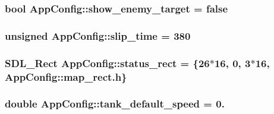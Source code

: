 \subsubsection[{show\+\_\+enemy\+\_\+target}]{\setlength{\rightskip}{0pt plus 5cm}bool App\+Config\+::show\+\_\+enemy\+\_\+target = false\hspace{0.3cm}{\ttfamily [static]}}\label{class_app_config_a9ebca92d71f6aa8b351f675db12d2c80}
\hypertarget{class_app_config_a607f43c11d16d60415e59d9af744865b}{}
\subsubsection[{slip\+\_\+time}]{\setlength{\rightskip}{0pt plus 5cm}unsigned App\+Config\+::slip\+\_\+time = 380\hspace{0.3cm}{\ttfamily [static]}}\label{class_app_config_a607f43c11d16d60415e59d9af744865b}
\hypertarget{class_app_config_a6aa81e994502bb576cb7a203c9230a61}{}
\subsubsection[{status\+\_\+rect}]{\setlength{\rightskip}{0pt plus 5cm}S\+D\+L\+\_\+\+Rect App\+Config\+::status\+\_\+rect = \{26$\ast$16, 0, 3$\ast$16, App\+Config\+::map\+\_\+rect.\+h\}\hspace{0.3cm}{\ttfamily [static]}}\label{class_app_config_a6aa81e994502bb576cb7a203c9230a61}
\hypertarget{class_app_config_a7f52e49c897ef576443e8e0f177aa0a7}{}
\subsubsection[{tank\+\_\+default\+\_\+speed}]{\setlength{\rightskip}{0pt plus 5cm}double App\+Config\+::tank\+\_\+default\+\_\+speed = 0.\hspace{0.3cm}{\ttfamily [static]}}\label{class_app_config_a7f52e49c897ef576443e8e0f177aa0a7}
\hypertarget{class_app_config_a1a81d61ebe8ff5538a824fcf685c0e10}{}
